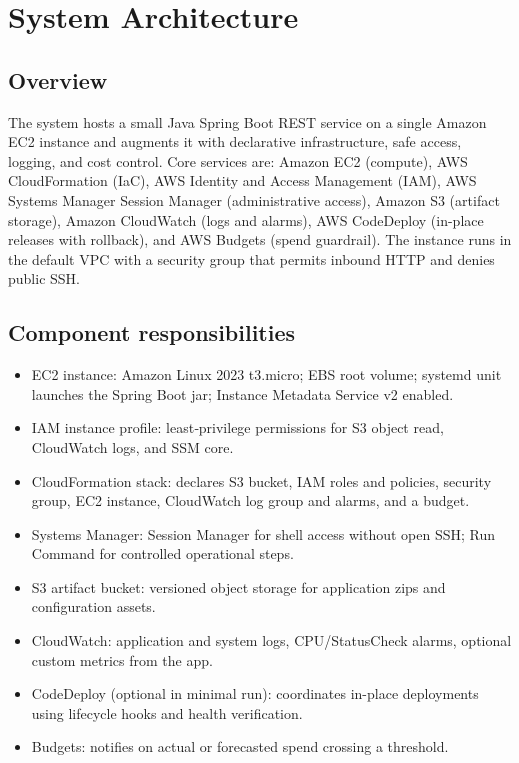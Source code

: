 \documentclass[12pt]{article}
\begin{document}
\section{System Architecture}\label{sec:architecture}

\subsection{Overview}
The system hosts a small Java Spring Boot REST service on a single Amazon EC2 instance and augments it with declarative infrastructure, safe access, logging, and cost control. Core services are: Amazon EC2 (compute), AWS CloudFormation (IaC), AWS Identity and Access Management (IAM), AWS Systems Manager Session Manager (administrative access), Amazon S3 (artifact storage), Amazon CloudWatch (logs and alarms), AWS CodeDeploy (in-place releases with rollback), and AWS Budgets (spend guardrail). The instance runs in the default VPC with a security group that permits inbound HTTP and denies public SSH.

\subsection{Component responsibilities}
\begin{itemize}
\item EC2 instance: Amazon Linux 2023 t3.micro; EBS root volume; systemd unit launches the Spring Boot jar; Instance Metadata Service v2 enabled.
\item IAM instance profile: least‑privilege permissions for S3 object read, CloudWatch logs, and SSM core.
\item CloudFormation stack: declares S3 bucket, IAM roles and policies, security group, EC2 instance, CloudWatch log group and alarms, and a budget.
\item Systems Manager: Session Manager for shell access without open SSH; Run Command for controlled operational steps.
\item S3 artifact bucket: versioned object storage for application zips and configuration assets.
\item CloudWatch: application and system logs, CPU/StatusCheck alarms, optional custom metrics from the app.
\item CodeDeploy (optional in minimal run): coordinates in-place deployments using lifecycle hooks and health verification.
\item Budgets: notifies on actual or forecasted spend crossing a threshold.
\end{itemize}
\end{document}
